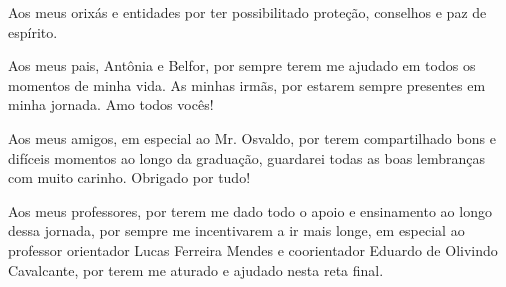 \documentclass[12pt]{artigoifce}
\begin{document}
Aos meus orixás e entidades por ter possibilitado proteção, conselhos e paz de espírito.

Aos meus pais, Antônia e Belfor, por sempre terem me ajudado em todos os momentos de minha vida. As minhas irmãs, por estarem sempre presentes em minha jornada. Amo todos vocês!

Aos meus amigos, em especial ao Mr. Osvaldo, por terem compartilhado bons e difíceis momentos ao longo da graduação, guardarei todas as boas lembranças com muito carinho. Obrigado por tudo!

Aos meus professores, por terem me dado todo o apoio e ensinamento ao longo dessa jornada, por sempre me incentivarem a ir mais longe, em especial ao professor orientador Lucas Ferreira Mendes e coorientador Eduardo de Olivindo Cavalcante, por terem me aturado e ajudado nesta reta final.
\end{document}
